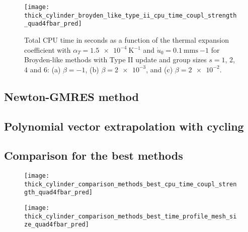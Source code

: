 \begin{figure}
  \texttt{[image: thick\_cylinder\_broyden\_like\_type\_ii\_cpu\_time\_coupl\_strength\_quad4fbar\_pred]}
  \caption{Total CPU time in seconds as a function of the thermal expansion coefficient with \(\alpha_T=\SI{1.5e-4}{\kelvin^{-1}}\) and \(\dot u_0 =\SI{0.1}{\milli\meter\second~{-1}}\) for Broyden-like methods with Type II update and group sizes \(s=1\), 2, 4 and 6: (a) \(\beta=-1\), (b) \(\beta=\num{2e-3}\), and (c) \(\beta=\num{2e-2}\).}
\label{fig:thick_cylinder_broyden_like_type_ii_cpu_time_coupl_strength_quad4fbar_pred}
\end{figure}


\subsection{Newton-GMRES method}

\subsection{Polynomial vector extrapolation with cycling}

\subsection{Comparison for the best methods}

\begin{figure}
\texttt{[image: thick\_cylinder\_comparison\_methods\_best\_cpu\_time\_coupl\_strength\_quad4fbar\_pred]}
\end{figure}

\begin{figure}
\texttt{[image: thick\_cylinder\_comparison\_methods\_best\_time\_profile\_mesh\_size\_quad4fbar\_pred]}
\end{figure}


